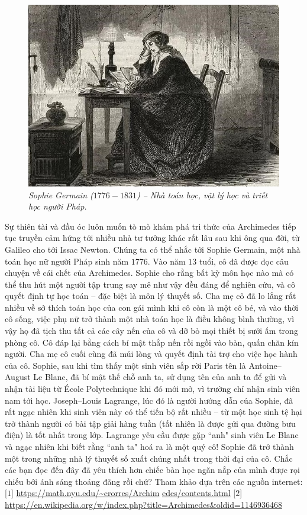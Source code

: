 \begin{multicols}{2}
\begin{figure}[H]
		\includegraphics[width= 1\linewidth]{4}
		\caption{\small\textit{\color{quantoan}Sophie Germain ($1776-1831$) -- Nhà toán học, vật lý học và triết học người Pháp.}}
		\vspace*{-10pt}
	\end{figure}
	Sự thiên tài và đầu óc luôn muốn tò mò khám phá tri thức của Archimedes tiếp tục truyền cảm hứng tới nhiều nhà tư tưởng khác rất lâu sau khi ông qua đời, từ Galileo cho tới Issac Newton. Chúng ta có thể nhắc tới Sophie Germain, một nhà toán học nữ người Pháp sinh năm $1776$. Vào năm $13$ tuổi, cô đã được đọc câu chuyện về cái chết của Archimedes. Sophie cho rằng bất kỳ môn học nào mà có thể thu hút một người tập trung say mê như vậy đều đáng để nghiên cứu, và cô quyết định tự học toán -- đặc biệt là môn lý thuyết số. Cha mẹ cô đã lo lắng rất nhiều về sở thích toán học của con gái mình khi cô còn là một cô bé, và vào thời cô sống, việc phụ nữ trở thành một nhà toán học là điều không bình thường, vì vậy họ đã tịch thu tất cả các cây nến của cô và dỡ bỏ mọi thiết bị sưởi ấm trong phòng cô. Cô đáp lại bằng cách bí mật thắp nến rồi ngồi vào bàn, quấn chăn kín người. Cha mẹ cô cuối cùng đã mủi lòng và quyết định tài trợ cho việc học hành của cô. Sophie, sau khi tìm thấy một sinh viên sắp rời Paris tên là Antoine--August Le Blanc, đã bí mật thế chỗ anh ta, sử dụng tên của anh ta để gửi và nhận tài liệu từ École Polytechnique khi đó mới mở,  vì trường chỉ nhận sinh viên nam tới học. Joseph--Louis Lagrange, lúc đó là người hướng dẫn của Sophie, đã rất ngạc nhiên khi  sinh viên này có thể tiến bộ rất nhiều -- từ một học sinh tệ hại trở thành người có bài tập giải hàng tuần (tất nhiên là được gửi qua đường bưu điện) là tốt nhất trong lớp. Lagrange yêu cầu được gặp ``anh" sinh viên Le Blanc và ngạc nhiên khi biết rằng ``anh ta" hoá ra là một quý cô! Sophie đã trở thành một trong những nhà lý thuyết số xuất chúng nhất trong thời đại của cô.
	\vskip 0.1cm
	Chắc các bạn đọc đến đây đã yêu thích hơn chiếc bàn học ngăn nắp của mình được rọi chiếu bởi ánh sáng thoáng đãng rồi chứ?
	\vskip 0.1cm
	Tham khảo dựa trên các nguồn internet:
	\vskip 0.1cm
	[$1$]	\url{https://math.nyu.edu/~crorres/Archim} \linebreak\url{edes/contents.html}
	\vskip 0.1cm
	[$2$]	\url{https://en.wikipedia.org/w/index.php?title=Archimedes&oldid=1146936468}
\end{multicols}
